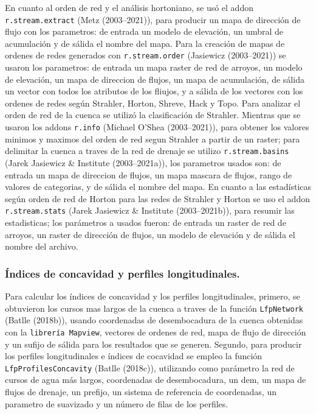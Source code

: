 \documentclass[11pt,]{article}
\begin{document}
En cuanto al orden de red y el análisis hortoniano, se usó el addon
\texttt{r.stream.extract} (Metz (2003--2021)), para producir un mapa de
dirección de flujo con los parametros: de entrada un modelo de
elevación, un umbral de acumulación y de sálida el nombre del mapa. Para
la creación de mapas de ordenes de redes generados con
\texttt{r.stream.order} (Jasiewicz (2003--2021)) se usaron los
parametros: de entrada un mapa raster de red de arroyos, un modelo de
elevación, un mapa de direccion de flujos, un mapa de acumulación, de
sálida un vector con todos los atributos de los fliujos, y a sálida de
los vectores con los ordenes de redes según Strahler, Horton, Shreve,
Hack y Topo. Para analizar el orden de red de la cuenca se utilizó la
clasificación de Strahler. Mientras que se usaron los addons
\texttt{r.info} (Michael O'Shea (2003--2021)), para obtener los valores
minimos y maximos del orden de red segun Strahler a partir de un raster;
para delimitar la cuenca a traves de la red de drenaje se utilizo
\texttt{r.stream.basins} (Jarek Jasiewicz \& Institute (2003--2021a)),
los parametros usados son: de entrada un mapa de direccion de flujos, un
mapa mascara de flujos, rango de valores de categorias, y de sálida el
nombre del mapa. En cuanto a las estadísticas según orden de red de
Horton para las redes de Strahler y Horton se uso el addon
\texttt{r.stream.stats} (Jarek Jasiewicz \& Institute (2003--2021b)),
para resumir las estadisticas; los parámetros a usados fueron: de
entrada un raster de red de arroyos, un raster de dirección de flujos,
un modelo de elevación y de sálida el nombre del archivo.

\subsubsection{Índices de concavidad y perfiles
longitudinales.}\label{uxedndices-de-concavidad-y-perfiles-longitudinales.}

Para calcular los índices de concavidad y los perfiles longitudinales,
primero, se obtuvieron los cursos mas largos de la cuenca a traves de la
función \texttt{LfpNetwork} (Batlle (2018b)), usando coordenadas de
desembocadura de la cuenca obtenidas con la \texttt{librería\ Mapview},
vectores de ordenes de red, mapa de flujo de dirección y un sufijo de
sálida para los resultados que se generen. Segundo, para producir los
perfiles longitudinales e índices de cocavidad se empleo la función
\texttt{LfpProfilesConcavity} (Batlle (2018c)), utilizando como
parámetro la red de cursos de agua más largos, coordenadas de
desembocadura, un dem, un mapa de flujos de drenaje, un prefijo, un
sistema de referencia de coordenadas, un parametro de suavizado y un
número de filas de los perfiles.
\end{document}
